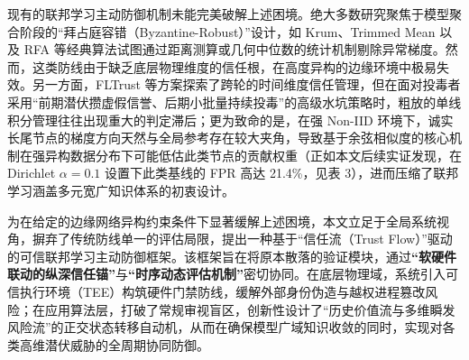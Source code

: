 \documentclass[11pt, a4paper, UTF8, fontset=fandol]{ctexart}
\begin{document}
现有的联邦学习主动防御机制未能完美破解上述困境。绝大多数研究聚焦于模型聚合阶段的“拜占庭容错（Byzantine-Robust）”设计，如 Krum、Trimmed Mean 以及 RFA 等经典算法试图通过距离测算或几何中位数的统计机制剔除异常梯度\cite{blanchard2017krum,yin2018byzantine,pillutla2022robust}。然而，这类防线由于缺乏底层物理维度的信任根，在高度异构的边缘环境中极易失效。另一方面，FLTrust 等方案探索了跨轮的时间维度信任管理\cite{cao2021fltrust,fung2020foolsgold}，但在面对投毒者采用“前期潜伏攒虚假信誉、后期小批量持续投毒”的高级水坑策略时，粗放的单线积分管理往往出现重大的判定滞后；更为致命的是，在强 Non-IID 环境下，诚实长尾节点的梯度方向天然与全局参考存在较大夹角，导致基于余弦相似度的核心机制在强异构数据分布下可能低估此类节点的贡献权重（正如本文后续实证发现，在 Dirichlet $\alpha=0.1$ 设置下此类基线的 FPR 高达 21.4\%，见表 3），进而压缩了联邦学习涵盖多元宽广知识体系的初衷设计。

为在给定的边缘网络异构约束条件下显著缓解上述困境，本文立足于全局系统视角，摒弃了传统防线单一的评估局限，提出一种基于“信任流（Trust Flow）”驱动的可信联邦学习主动防御框架。该框架旨在将原本散落的验证模块，通过\textbf{“软硬件联动的纵深信任锚”}与\textbf{“时序动态评估机制”}密切协同。在底层物理域，系统引入可信执行环境（TEE）构筑硬件门禁防线，缓解外部身份伪造与越权进程篡改风险；在应用算法层，打破了常规审视盲区，创新性设计了“历史价值流与多维瞬发风险流”的正交状态转移自动机，从而在确保模型广域知识收敛的同时，实现对各类高维潜伏威胁的全周期协同防御。
\end{document}
